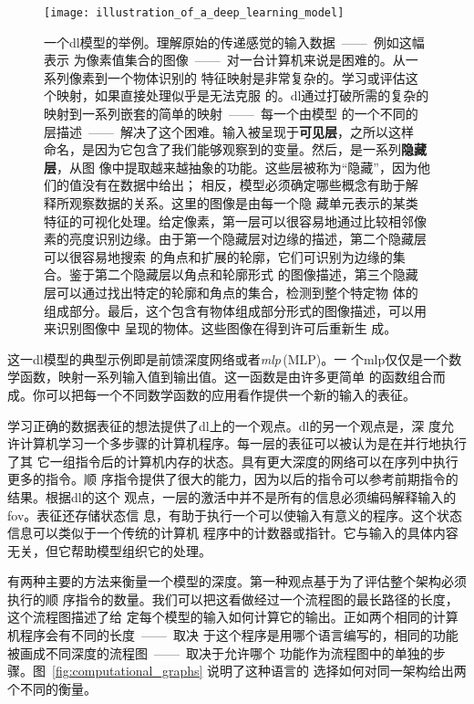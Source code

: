 \begin{figure}[h]
  \centering
  \texttt{[image: illustration\_of\_a\_deep\_learning\_model]}
  \caption{一个\gls*{dl}模型的举例。理解原始的传递感觉的输入数据~——~例如这幅表示
    为像素值集合的图像~——~对一台计算机来说是困难的。从一系列像素到一个物体识别的
    特征映射是非常复杂的。学习或评估这个映射，如果直接处理似乎是无法克服
    的。\gls*{dl}通过打破所需的复杂的映射到一系列嵌套的简单的映射~——~每一个由模型
    的一个不同的层描述~——~解决了这个困难。输入被呈现于\textbf{可见层}，之所以这样
    命名，是因为它包含了我们能够观察到的变量。然后，是一系列\textbf{隐藏层}，从图
    像中提取越来越抽象的功能。这些层被称为``隐藏''，因为他们的值没有在数据中给出；
    相反，模型必须确定哪些概念有助于解释所观察数据的关系。这里的图像是由每一个隐
    藏单元表示的某类特征的可视化处理。给定像素，第一层可以很容易地通过比较相邻像
    素的亮度识别边缘。由于第一个隐藏层对边缘的描述，第二个隐藏层可以很容易地搜索
    的角点和扩展的轮廓，它们可识别为边缘的集合。鉴于第二个隐藏层以角点和轮廓形式
    的图像描述，第三个隐藏层可以通过找出特定的轮廓和角点的集合，检测到整个特定物
    体的组成部分。最后，这个包含有物体组成部分形式的图像描述，可以用来识别图像中
    呈现的物体。这些图像在得到\citet{ZeilerFergus14}许可后重新生
    成。\label{fig:illustration_of_a_deep_learning_model}}
\end{figure}

这一\gls*{dl}模型的典型示例即是前馈深度网络或者\emph{\gls{mlp}}\,(MLP)。一
个\gls*{mlp}仅仅是一个数学函数，映射一系列输入值到输出值。这一函数是由许多更简单
的函数组合而成。你可以把每一个不同数学函数的应用看作提供一个新的输入的表征。

学习正确的数据表征的想法提供了\gls*{dl}上的一个观点。\gls*{dl}的另一个观点是，深
度允许计算机学习一个多步骤的计算机程序。每一层的表征可以被认为是在并行地执行了其
它一组指令后的计算机内存的状态。具有更大深度的网络可以在序列中执行更多的指令。顺
序指令提供了很大的能力，因为以后的指令可以参考前期指令的结果。根据\gls*{dl}的这个
观点，一层的激活中并不是所有的信息必须编码解释输入的\gls*{fov}。表征还存储状态信
息，有助于执行一个可以使输入有意义的程序。这个状态信息可以类似于一个传统的计算机
程序中的计数器或指针。它与输入的具体内容无关，但它帮助模型组织它的处理。

有两种主要的方法来衡量一个模型的深度。第一种观点基于为了评估整个架构必须执行的顺
序指令的数量。我们可以把这看做经过一个流程图的最长路径的长度，这个流程图描述了给
定每个模型的输入如何计算它的输出。正如两个相同的计算机程序会有不同的长度~——~取决
于这个程序是用哪个语言编写的，相同的功能被画成不同深度的流程图~——~取决于允许哪个
功能作为流程图中的单独的步骤。图~\ref{fig:computational_graphs} 说明了这种语言的
选择如何对同一架构给出两个不同的衡量。

